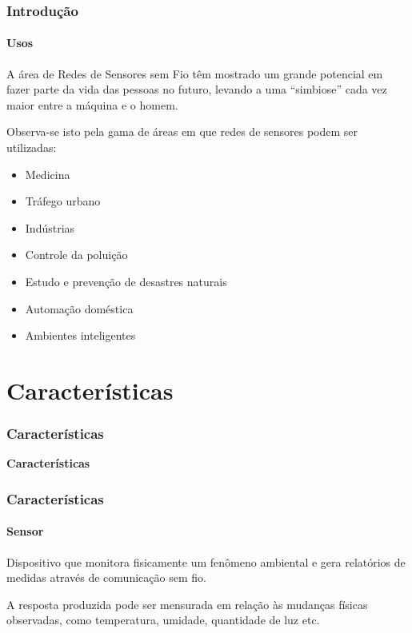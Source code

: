 \documentclass[notes]{beamer}
\begin{document}
\begin{frame}
\frametitle{Introdução}
\framesubtitle{Usos}

\begin{block}

A área de Redes de Sensores sem Fio têm mostrado um grande potencial em fazer parte da vida das pessoas no futuro, levando a uma “simbiose” cada vez maior entre a máquina e o homem\cite{Redes_Sensores}. 

\end{block} \pause

\begin{block}

Observa-se isto pela gama de áreas em que redes de sensores podem ser utilizadas: \pause

\begin{itemize}

\item Medicina \pause
\item Tráfego urbano \pause
\item Indústrias \pause
\item Controle da poluição \pause
\item Estudo e prevenção de desastres naturais \pause
\item Automação doméstica \pause
\item Ambientes inteligentes 

\end{itemize}

\end{block}

\end{frame}

\section{Características}
\begin{frame}
\frametitle{Características}

\begin{block}

 \center \textbf{Características}
 
\end{block}

\end{frame}

\begin{frame}
\frametitle{Características}
\framesubtitle{Sensor}

\begin{block}

Dispositivo que monitora fisicamente um fenômeno ambiental e gera
relatórios de medidas através de comunicação sem
fio\cite{Clicia}.
\end{block}

\begin{block}

A resposta produzida pode ser mensurada em relação às mudanças físicas observadas, como temperatura, umidade, quantidade de luz etc.
\end{block}

\end{frame}
\end{document}

